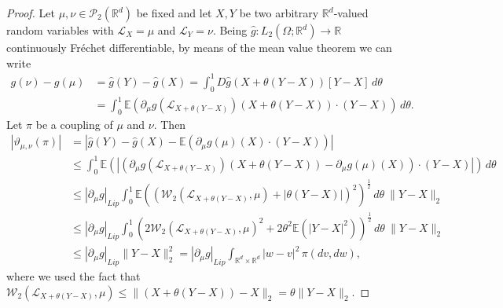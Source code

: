 \documentclass[10pt,a4paper]{amsart}
\newcommand{\E}{\mathbb{E}}
\newcommand{\R}{\mathbb{R}}
\begin{document}
    \begin{proof}
        Let $\mu,\nu \in \mathcal{P}_2(\R^d)$ be fixed and let $X,Y$ be two arbitrary $\R^d$-valued random variables with $\mathcal{L}_X=\mu$ and $\mathcal{L}_Y = \nu$. 
        Being $\hat{g}:L_2(\Omega;\R^d) \to \R$ continuously Fréchet differentiable, by means of the mean value theorem we can write \begin{align*}
            g(\nu) - g(\mu) &= \hat{g}(Y) - \hat{g}(X) = \int_0^1 D\hat{g}(X + \theta(Y-X)) [Y-X] \, d\theta  \\ 
            &= \int_0^1 \E(\partial_\mu g(\mathcal{L}_{X + \theta(Y-X)}) (X + \theta(Y-X)) \cdot (Y-X) ) \, d\theta .
        \end{align*}
        Let $\pi$ be a coupling of $\mu$ and $\nu$. Then 
        \begin{equation*} 
            \begin{split}
                |\vartheta_{\mu,\nu} ( \pi)| &= |\hat{g}(Y) - \hat{g}(X) - \E(\partial_\mu g(\mu)(X) \cdot (Y-X))| \\
                &\le \int_0^1 \E(|(\partial_\mu g(\mathcal{L}_{X + \theta(Y-X)}) (X + \theta(Y-X)) - \partial_\mu g(\mu) (X) )\cdot (Y-X)|) \, d\theta \\
                &\le |\partial_\mu g|_{Lip} \int_0^1 \E((\mathcal{W}_2(\mathcal{L}_{X + \theta (Y-X)},\mu) + | \theta (Y-X)|)^2)^\frac12 \, d\theta \  \|Y-X\|_2 \\
                &\le |\partial_\mu g|_{Lip} \int_0^1 (2 \mathcal{W}_2(\mathcal{L}_{X + \theta (Y-X)},\mu)^2 + 2\theta^2 \E(|Y-X|^2))^\frac12 \, d\theta \ \|Y-X\|_2 \\
                &\le |\partial_\mu g|_{Lip} \|Y-X\|_2^2 =  |\partial_\mu g|_{Lip}  \int_{\R^d \times \R^d} |w-v|^2 \, \pi(dv,dw),
            \end{split}
        \end{equation*}
        where we used the fact that $\mathcal{W}_2(\mathcal{L}_{X + \theta (Y-X)},\mu) \le \| (X + \theta (Y-X)) - X\|_2 = \theta \|Y-X\|_2 $.
    \end{proof}
\end{document}
